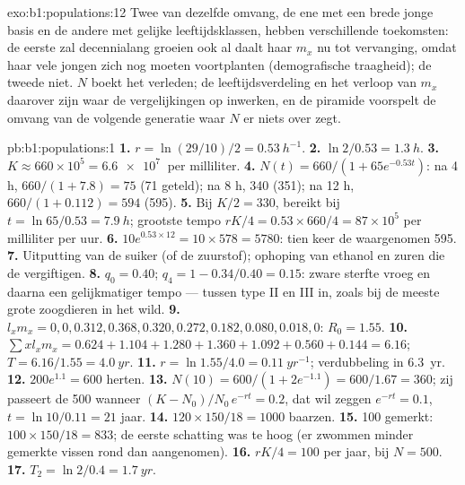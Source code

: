 \begin{solution}{exo:b1:populations:12}
Twee  van dezelfde omvang, de ene met een brede jonge basis en de
andere met gelijke leeftijdsklassen, hebben verschillende toekomsten: de
eerste zal decennialang groeien ook al daalt haar $m_x$ nu tot vervanging,
omdat haar vele jongen zich nog moeten voortplanten (demografische
traagheid); de tweede niet. $N$ boekt het verleden; de leeftijdsverdeling en
het verloop van $m_x$ daarover zijn waar de vergelijkingen op inwerken, en
de piramide voorspelt de omvang van de volgende generatie waar $N$ er niets
over zegt.
\end{solution}

\begin{solution}{pb:b1:populations:1}
\textbf{1.} $r = \ln(29/10)/2 = \qty{0.53}{h^{-1}}$.
\textbf{2.} $\ln 2/0.53 = \qty{1.3}{h}$.
\textbf{3.} $K \approx 660\times 10^5 = \qty{6.6e7}{}$  per
milliliter.
\textbf{4.} $N(t) = 660/(1 + 65e^{-0.53t})$: na 4 h, $660/(1 + 7.8) =
75$ (71 geteld); na 8 h, 340 (351); na 12 h, $660/(1 + 0.112) = 594$
(595).
\textbf{5.} Bij $K/2 = 330$, bereikt bij $t = \ln 65/0.53 = \qty{7.9}{h}$;
grootste tempo $rK/4 = 0.53\times 660/4 = 87\times 10^5$  per
milliliter per uur.
\textbf{6.} $10e^{0.53\times 12} = 10\times 578 = 5780$: tien keer de
waargenomen 595.
\textbf{7.} Uitputting van de suiker (of de zuurstof); ophoping van ethanol
en zuren die de  vergiftigen.
\textbf{8.} $q_0 = 0.40$; $q_4 = 1 - 0.34/0.40 = 0.15$: zware sterfte vroeg
en daarna een gelijkmatiger tempo --- tussen type II en III in, zoals bij de
meeste grote zoogdieren in het wild.
\textbf{9.} $l_x m_x = 0, 0, 0.312, 0.368, 0.320, 0.272, 0.182, 0.080,
0.018, 0$: $R_0 = 1.55$.
\textbf{10.} $\sum x l_x m_x = 0.624 + 1.104 + 1.280 + 1.360 + 1.092 +
0.560 + 0.144 = 6.16$; $T = 6.16/1.55 = \qty{4.0}{yr}$.
\textbf{11.} $r = \ln 1.55/4.0 = \qty{0.11}{yr^{-1}}$; verdubbeling in
\qty{6.3}{yr}.
\textbf{12.} $200e^{1.1} = 600$ herten.
\textbf{13.} $N(10) = 600/(1 + 2e^{-1.1}) = 600/1.67 = 360$; zij passeert de
500 wanneer $(K - N_0)/N_0\,e^{-rt} = 0.2$, dat wil zeggen $e^{-rt} = 0.1$, $t = \ln
10/0.11 = 21$ jaar.
\textbf{14.} $120\times 150/18 = 1000$ baarzen.
\textbf{15.} 100 gemerkt: $100\times 150/18 = 833$; de eerste schatting was
te hoog (er zwommen minder gemerkte vissen rond dan aangenomen).
\textbf{16.} $rK/4 = 100$ per jaar, bij $N = 500$.
\textbf{17.} $T_2 = \ln 2/0.4 = \qty{1.7}{yr}$.

\end{solution}
